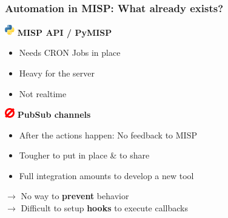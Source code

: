 
\begin{frame}[t,plain]
\titlepage
\end{frame}

\begin{frame}
    \frametitle{Automation in MISP: What already exists?}
    \includegraphics[valign=m,width=16px]{pictures/python-logo.png}\hspace*{0.5em} \textbf{MISP API / PyMISP}
    \begin{itemize}
        \item Needs CRON Jobs in place
        \item Heavy for the server
        \item Not realtime
    \end{itemize}
    \vspace*{1em}
    \includegraphics[valign=m,width=16px]{pictures/zeromq.png}\hspace*{0.5em} \textbf{PubSub channels}
    \begin{itemize}
        \item After the actions happen: No feedback to MISP
        \item Tougher to put in place \& to share
        \item Full integration amounts to develop a new tool
    \end{itemize}
    \vspace*{0.5em}
    $\rightarrow$ No way to \textbf{prevent} behavior\\
    $\rightarrow$ Difficult to setup \textbf{hooks} to execute callbacks
\end{frame}

